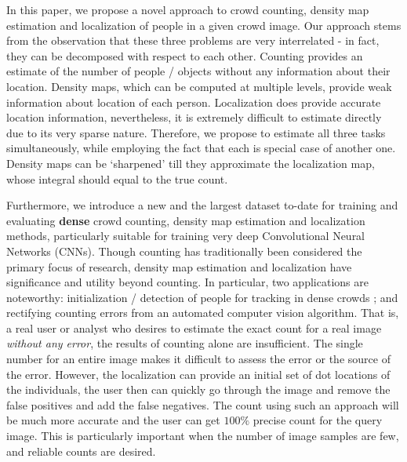 \documentclass[runningheads]{llncs}
\begin{document}
In this paper, we propose a novel approach to crowd counting, density map estimation and localization of people in a given crowd image. Our approach stems from the observation that these three problems are very interrelated - in fact, they can be decomposed with respect to each other. Counting provides an estimate of the number of people / objects without any information about their location. Density maps, which can be computed at multiple levels, provide weak information about location of each person. Localization does provide accurate location information, nevertheless, it is extremely difficult to estimate directly due to its very sparse nature. Therefore, we propose to estimate all three tasks simultaneously, while employing the fact that each is special case of another one. Density maps can be `sharpened' till they approximate the localization map, whose integral should equal to the true count.

Furthermore, we introduce a new and the largest dataset to-date for training and evaluating \textbf{dense} crowd counting, density map estimation and localization methods, particularly suitable for training very deep Convolutional Neural Networks (CNNs). Though counting has traditionally been considered the primary focus of research, density map estimation and localization have significance and utility beyond counting. In particular, two applications are noteworthy: initialization / detection of people for tracking in dense crowds \cite{idrees2014tracking}; and rectifying counting errors from an automated computer vision algorithm. That is, a real user or analyst who desires to estimate the exact count for a real image \textit{without any error}, the results of counting alone are insufficient. The single number for an entire image makes it difficult to assess the error or the source of the error. However, the localization can provide an initial set of dot locations of the individuals, the user then can quickly go through the image and remove the false positives and add the false negatives. The count using such an approach will be much more accurate and the user can get $100\%$ precise count for the query image. This is particularly important when the number of image samples are few, and reliable counts are desired.
\end{document}
